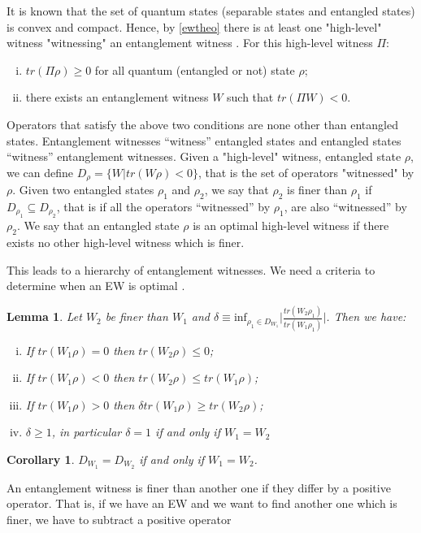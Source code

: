 \documentclass[10pt,a4paper]{book}
\numberwithin{equation}{chapter}
\numberwithin{figure}{chapter}
\numberwithin{table}{chapter}
\newtheorem{corollary}{Corollary}
\newtheorem{lemma}{Lemma}[section]
\begin{document}
It is known that the set of quantum states (separable states and entangled states) is convex and compact. Hence, by \autoref{ewtheo} there is at least one "high-level" witness "witnessing" an entanglement witness \cite{optimalEW}. For this high-level witness $\Pi$:
\begin{enumerate}[(i)]
\item $tr(\Pi \rho)\geq 0$ for all quantum (entangled or not) state $\rho$;
\item there exists an entanglement witness $W$ such that $tr(\Pi W)< 0$. 
\end{enumerate}
Operators that satisfy the above two conditions are none other than entangled states. Entanglement witnesses “witness” entangled states and entangled states “witness” entanglement witnesses. Given a "high-level" witness, entangled state $\rho$, we can define $D_{\rho}=\lbrace W | tr(W\rho)<0 \rbrace$, that is the set of operators "witnessed" by $\rho$. Given two entangled states $\rho_1$ and $\rho_2$, we say that $\rho_2$ is finer than $\rho_1$ if $D_{\rho_1}\subseteq D_{\rho_2}$, that is if all the operators “witnessed” by $\rho_1$, are also “witnessed” by $\rho_2$. We say that an entangled state $\rho$ is an optimal high-level witness if there exists no other high-level witness which is finer. 

This leads to a hierarchy of entanglement witnesses. We need a criteria to determine when an EW is optimal \cite{optimalEWKraus}. 
\begin{lemma} Let $W_2$ be finer than $W_1$ and $\delta \equiv \text{inf}_{\rho_1 \in D_{W_1}}\vert \frac{tr(W_2 \rho_1)}{tr(W_1 \rho_1)} \vert$. Then we have:
\begin{enumerate}[(i)]
\item If $tr(W_1 \rho)=0$ then $tr(W_2 \rho) \leq 0$;
\item If $tr(W_1 \rho) < 0$ then $tr(W_2 \rho) \leq tr(W_1\rho)$;
\item If $tr(W_1 \rho) > 0$ then $\delta tr(W_1 \rho) \geq tr(W_2 \rho)$;
\item $\delta \geq 1$, in particular $\delta=1$ if and only if $W_1 =W_2$
\end{enumerate}
\label{lem:w_1}
\end{lemma}
\begin{corollary} $D_{W_1}=D_{W_2}$ if and only if $W_1 =W_2$.
\end{corollary}

An entanglement witness is finer than another one if they differ by a positive operator.  That is, if we have an EW and we want to find another one which is finer, we have to subtract a positive operator
\end{document}
